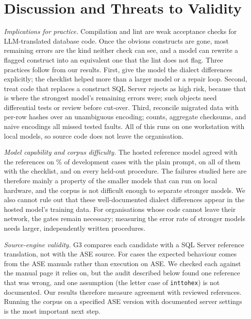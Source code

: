\section{Discussion and Threats to Validity}\label{sec:discussion}

\textit{Implications for practice.} Compilation and lint are weak acceptance checks for LLM-translated
database code. Once the obvious constructs are gone, most remaining errors are the kind neither check can
see, and a model can rewrite a flagged construct into an equivalent one that the lint does not flag. Three
practices follow from our results. First, give the model the dialect differences explicitly; the checklist
helped more than a larger model or a repair loop. Second, treat code that replaces a construct SQL Server
rejects as high risk, because that is where the strongest model's remaining errors were; such objects need
differential tests or review before cut-over. Third, reconcile migrated data with per-row hashes over an
unambiguous encoding; counts, aggregate checksums, and naive encodings all missed tested faults. All of this
runs on one workstation with local models, so source code does not leave the organisation.

\textit{Model capability and corpus difficulty.} The hosted reference model agreed with the references on
\HostedPlainEquiv\% of development cases with the plain prompt, on all of them with the checklist, and on
every held-out procedure. The failures studied here are therefore mainly a property of the smaller models
that can run on local hardware, and the corpus is not difficult enough to separate stronger models. We also
cannot rule out that these well-documented dialect differences appear in the hosted model's training data.
For organisations whose code cannot leave their network, the gates remain necessary; measuring the error
rate of stronger models needs larger, independently written procedures.

\textit{Source-engine validity.} G3 compares each candidate with a SQL Server reference translation, not
with the ASE source. For \NumReviewCases{} cases the expected behaviour comes from the ASE manuals rather
than execution on ASE. We checked each against the manual page it relies on, but the audit described
below found one reference that was wrong, and one assumption (the letter case of \texttt{inttohex}) is not
documented. Our
results therefore measure agreement with reviewed references. Running the corpus on a specified ASE version
with documented server settings is the most important next step.

